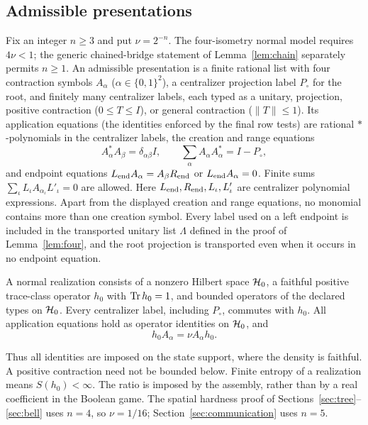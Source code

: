 \subsection{Admissible presentations}\label{sec:admissible}
\begin{definition}\label{def:admissible}
Fix an integer $n\geq3$ and put $\nu=2^{-n}$. The four-isometry normal model requires $4\nu<1$; the generic chained-bridge statement of Lemma~\ref{lem:chain} separately permits $n\geq1$. An admissible presentation is a finite rational list with four contraction symbols $A_\alpha$ ($\alpha\in\{0,1\}^2$), a centralizer projection label $P_{\circ}$ for the root, and finitely many centralizer labels, each typed as a unitary, projection, positive contraction ($0\leq T\leq I$), or general contraction ($\|T\|\leq1$). Its application equations (the identities enforced by the final row tests) are rational $*$-polynomials in the centralizer labels, the creation and range equations
\[
 A_\alpha^*A_\beta=\delta_{\alpha\beta}I,\qquad
 \sum_\alpha A_\alpha A_\alpha^*=I-P_{\circ},
\]
and endpoint equations $L_{\rm end}A_\alpha=A_\beta R_{\rm end}$ or $L_{\rm end}A_\alpha=0$. Finite sums $\sum_\iota L_\iota A_{\alpha_\iota}L'_\iota=0$ are allowed. Here $L_{\rm end},R_{\rm end},L_\iota,L'_\iota$ are centralizer polynomial expressions. Apart from the displayed creation and range equations, no monomial contains more than one creation symbol. Every label used on a left endpoint is included in the transported unitary list $\Lambda$ defined in the proof of Lemma~\ref{lem:four}, and the root projection is transported even when it occurs in no endpoint equation.

A normal realization consists of a nonzero Hilbert space $\mathcal H_0$, a faithful positive trace-class operator $h_0$ with $\operatorname{Tr} h_0=1$, and bounded operators of the declared types on $\mathcal H_0$. Every centralizer label, including $P_{\circ}$, commutes with $h_0$. All application equations hold as operator identities on $\mathcal H_0$, and
\begin{equation}\label{eq:covariance}
 h_0A_\alpha=\nu A_\alpha h_0.
\end{equation}
\end{definition}
Thus all identities are imposed on the state support, where the density is faithful. A positive contraction need not be bounded below. Finite entropy of a realization means $S(h_0)<\infty$. The ratio is imposed by the assembly, rather than by a real coefficient in the Boolean game. The spatial hardness proof of Sections~\ref{sec:tree}--\ref{sec:bell} uses $n=4$, so $\nu=1/16$; Section~\ref{sec:communication} uses $n=5$.

